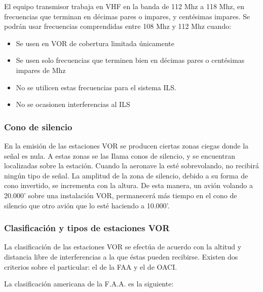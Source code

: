 El equipo transmisor trabaja en VHF en la banda de 112 Mhz a 118 Mhz, en frecuencias que terminan en décimas pares o impares, y centésimas impares. Se podrán usar frecuencias comprendidas entre 108 Mhz y 112 Mhz cuando:

\begin{itemize}
\item Se usen en VOR de cobertura limitada únicamente

\item Se usen solo frecuencias que terminen bien en décimas pares o centésimas impares de Mhz

\item No se utilicen estas frecuencias para el sistema ILS.

\item No se ocasionen interferencias al ILS
\end{itemize}


\subsubsection{Cono de silencio}

En la emisión de las estaciones VOR se producen ciertas zonas ciegas donde la señal es nula. A estas zonas se las Ilama conos de silencio, y se encuentran localizadas sobre la estación. Cuando la aeronave la esté sobrevolando, no recibirá ningún tipo de señal. La amplitud de la zona de silencio, debido a su forma de cono invertido, se incrementa con la altura. De esta manera, un avión volando a 20.000' sobre una instalación VOR, permanecerá más tiempo en el cono de silencio que otro avión que lo esté haciendo a 10.000'.

\subsubsection{Clasificación y tipos de estaciones VOR}
\label{sec:clasificacion.y.tipo.estaciones.vor}

La clasificación de las estaciones VOR se efectúa de acuerdo con la altitud y distancia libre de interferencias a la que éstas pueden recibirse. Existen dos criterios sobre el particular: el de la FAA y el de OACI.

La clasificación americana de la F.A.A. es la siguiente:

